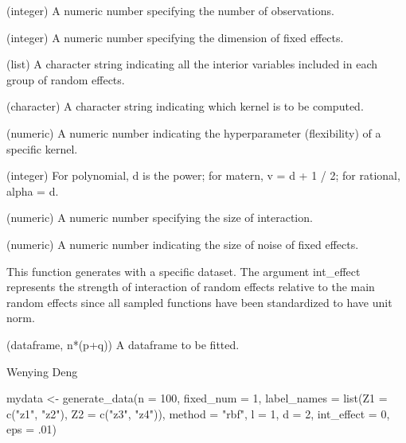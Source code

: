\documentclass[a4paper]{book}
\begin{document}
%
\begin{Arguments}
\begin{ldescription}
\item[\code{n}] (integer) A numeric number specifying the number of observations.

\item[\code{fixed\_num}] (integer) A numeric number specifying the dimension of
fixed effects.

\item[\code{label\_names}] (list) A character string indicating all the interior
variables included in each group of random effects.

\item[\code{method}] (character) A character string indicating which kernel is to
be computed.

\item[\code{l}] (numeric) A numeric number indicating the hyperparameter
(flexibility) of a specific kernel.

\item[\code{d}] (integer) For polynomial, d is the power; for matern, v = d + 1 /
2; for rational, alpha = d.

\item[\code{int\_effect}] (numeric) A numeric number specifying the size of
interaction.

\item[\code{eps}] (numeric) A numeric number indicating the size of noise of fixed
effects.
\end{ldescription}
\end{Arguments}
%
\begin{Details}\relax
This function generates with a specific dataset. The argument int\_effect
represents the strength of interaction of random effects relative to the
main random effects since all sampled functions have been standardized to
have unit norm.
\end{Details}
%
\begin{Value}
\begin{ldescription}
\item[\code{data}] (dataframe, n*(p+q)) A dataframe to be fitted.
\end{ldescription}
\end{Value}
%
\begin{Author}\relax
Wenying Deng
\end{Author}
%
\begin{Examples}
\begin{ExampleCode}



mydata <- generate_data(n = 100, fixed_num = 1, label_names =
list(Z1 = c("z1", "z2"), Z2 = c("z3", "z4")),
method = "rbf", l = 1, d = 2, int_effect = 0, eps = .01)



\end{ExampleCode}
\end{Examples}
\end{document}
